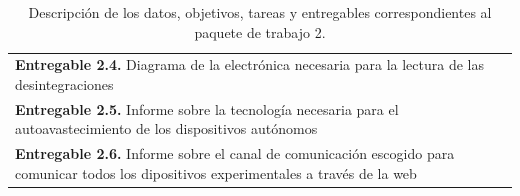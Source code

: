\documentclass[11pt]{extarticle}
\begin{document}
\begin{table}[H]
\begin{tabular}{|c|c|c|c|}
						\multicolumn{4}{|l|}{\multirow{3}{\linewidth}{\textbf{Entregable 2.4.} Diagrama de la electrónica necesaria para la lectura de las desintegraciones}} \\
						\multicolumn{4}{|l|}{}\\
						\multicolumn{4}{|l|}{}\\
						\multicolumn{4}{|l|}{\multirow{3}{\linewidth}{\textbf{Entregable 2.5.} Informe sobre la tecnología necesaria para el autoavastecimiento de los dispositivos autónomos}} \\
						\multicolumn{4}{|l|}{}\\
						\multicolumn{4}{|l|}{}\\
						\multicolumn{4}{|l|}{\multirow{3}{\linewidth}{\textbf{Entregable 2.6.} Informe sobre el canal de comunicación escogido para comunicar todos los dipositivos experimentales a través de la web}} \\
						\multicolumn{4}{|l|}{}\\
						\multicolumn{4}{|l|}{}\\ \hline
					\end{tabular}
					\caption{Descripción de los datos, objetivos, tareas y entregables correspondientes al paquete de trabajo 2.}
					\label{tab:WP1}
				\end{table}
\end{document}
